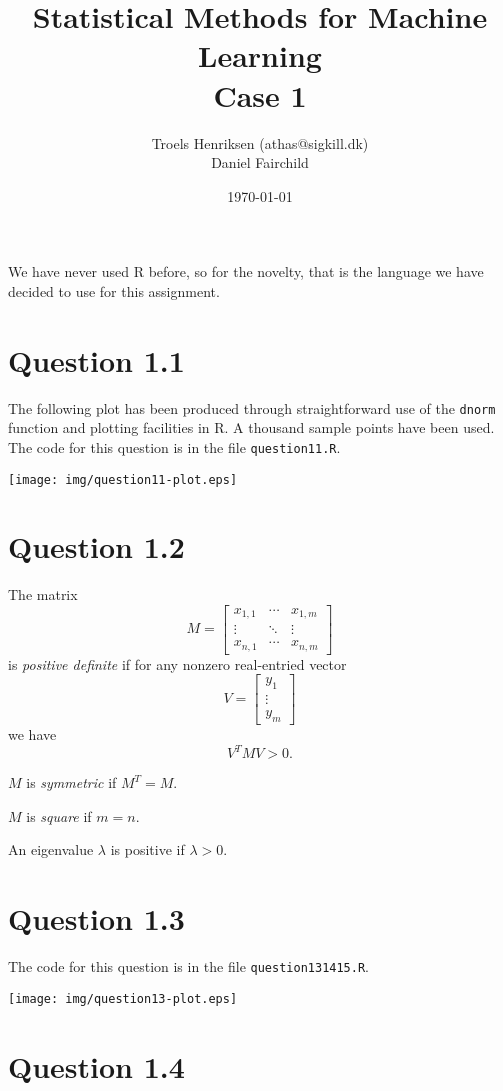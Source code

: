 \documentclass[a4paper, oneside, final]{memoir}
\title{Statistical Methods for Machine Learning\\Case 1}
\author{Troels Henriksen (athas@sigkill.dk) \\ Daniel Fairchild}
\date{\today}
\begin{document}
\maketitle

We have never used R before, so for the novelty, that is the language
we have decided to use for this assignment.

\section*{Question 1.1}

The following plot has been produced through straightforward use of
the \texttt{dnorm} function and plotting facilities in R.  A thousand
sample points have been used.  The code for this question is in the
file \texttt{question11.R}.

\texttt{[image: img/question11-plot.eps]}

\section*{Question 1.2}

The matrix
\[
M=\left[\begin{matrix}
  x_{1,1}&\cdots&x_{1,m}\\\vdots&\ddots&\vdots\\x_{n,1}&\cdots&x_{n,m} \end{matrix}\right]
\]
is \textit{positive definite} if for any nonzero real-entried vector
\[
V=\left[\begin{matrix} y_1 \\ \vdots \\ y_m \end{matrix}\right]
\]
we have
\[
V^TMV > 0.
\]

$M$ is \textit{symmetric} if $M^T=M$.

$M$ is \textit{square} if $m=n$.

An eigenvalue $\lambda$ is positive if $\lambda > 0$.

\section*{Question 1.3}

The code for this question is in the file \texttt{question131415.R}.

\texttt{[image: img/question13-plot.eps]}

\section*{Question 1.4}
\end{document}
